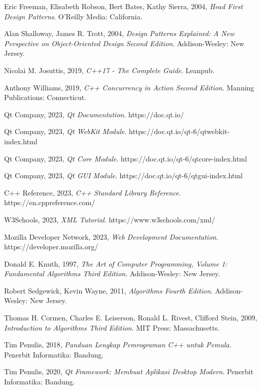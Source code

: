 \begin{thebibliography}{99}
Eric Freeman, Elisabeth Robson, Bert Bates, Kathy Sierra, 2004,
\emph{Head First Design Patterns}.
O'Reilly Media: California.

Alan Shalloway, James R. Trott, 2004,
\emph{Design Patterns Explained: A New Perspective on Object-Oriented Design Second Edition}.
Addison-Wesley: New Jersey.

Nicolai M. Josuttis, 2019,
\emph{C++17 - The Complete Guide}.
Leanpub.

Anthony Williams, 2019,
\emph{C++ Concurrency in Action Second Edition}.
Manning Publications: Connecticut.

Qt Company, 2023,
\emph{Qt Documentation}.
https://doc.qt.io/

Qt Company, 2023,
\emph{Qt WebKit Module}.
https://doc.qt.io/qt-6/qtwebkit-index.html

Qt Company, 2023,
\emph{Qt Core Module}.
https://doc.qt.io/qt-6/qtcore-index.html

Qt Company, 2023,
\emph{Qt GUI Module}.
https://doc.qt.io/qt-6/qtgui-index.html

C++ Reference, 2023,
\emph{C++ Standard Library Reference}.
https://en.cppreference.com/

W3Schools, 2023,
\emph{XML Tutorial}.
https://www.w3schools.com/xml/

Mozilla Developer Network, 2023,
\emph{Web Development Documentation}.
https://developer.mozilla.org/

Donald E. Knuth, 1997,
\emph{The Art of Computer Programming, Volume 1: Fundamental Algorithms Third Edition}.
Addison-Wesley: New Jersey.

Robert Sedgewick, Kevin Wayne, 2011,
\emph{Algorithms Fourth Edition}.
Addison-Wesley: New Jersey.

Thomas H. Cormen, Charles E. Leiserson, Ronald L. Rivest, Clifford Stein, 2009,
\emph{Introduction to Algorithms Third Edition}.
MIT Press: Massachusetts.

Tim Penulis, 2018,
\emph{Panduan Lengkap Pemrograman C++ untuk Pemula}.
Penerbit Informatika: Bandung.

Tim Penulis, 2020,
\emph{Qt Framework: Membuat Aplikasi Desktop Modern}.
Penerbit Informatika: Bandung.

\end{thebibliography}